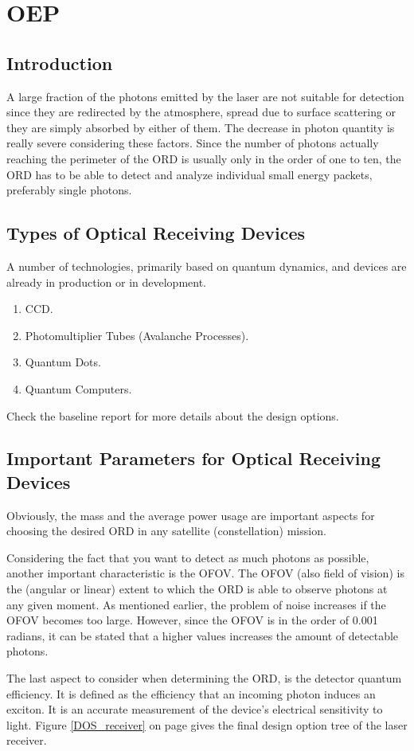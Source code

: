 \section{\acl{OEP}}
\label{designOptionsReceiver}
\subsection{Introduction}
A large fraction of the photons emitted by the \acs{laser} are not suitable for detection since they are redirected by the atmosphere, spread due to surface scattering or they are simply absorbed by either of them. The decrease in photon quantity is really severe considering these factors. Since the number of photons actually reaching the perimeter of the \ac{ORD} is usually only in the order of one to ten, the \acs{ORD} has to be able to detect and analyze individual small energy packets, preferably single photons. 

\subsection{Types of Optical Receiving Devices}
	\label{blDOtypesORD}
A number of technologies, primarily based on quantum dynamics, and devices are already in production or in development. 
\begin{enumerate}[i]
	\item \ac{CCD}. 
	\item Photomultiplier Tubes (Avalanche Processes). 
	\item Quantum Dots. 
	\item Quantum Computers. 
\end{enumerate}
Check the baseline report for more details about the design options.

\subsection{Important Parameters for Optical Receiving Devices}
	\label{blDOparametersORD}
Obviously, the mass and the average power usage are important aspects for choosing the desired \acs{ORD} in any satellite (constellation) mission. 

Considering the fact that you want to detect as much photons as possible, another important characteristic is the \ac{OFOV}. The \acs{OFOV} (also field of vision) is the (angular or linear) extent to which the \acs{ORD} is able to observe photons at any given moment. As mentioned earlier, the problem of noise increases if the \acs{OFOV} becomes too large. However, since the \acs{OFOV} is in the order of 0.001 radians, it can be stated that a higher values increases the amount of detectable photons.

The last aspect to consider when determining the \acs{ORD}, is the detector quantum efficiency. It is defined as the efficiency that an incoming photon induces an exciton. It is an accurate measurement of the device's electrical sensitivity to light. 
Figure \ref{DOS_receiver} on page \pageref{DOS_receiver} gives the final design option tree of the laser receiver.
